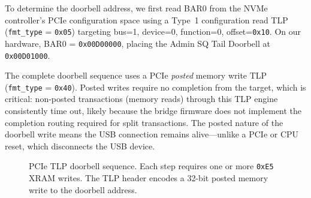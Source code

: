 \documentclass[conference]{IEEEtran}
\begin{document}
To determine the doorbell address, we first read BAR0 from the NVMe
controller's PCIe configuration space using a Type~1 configuration read
TLP (\texttt{fmt\_type} = \texttt{0x05}) targeting bus=1, device=0,
function=0, offset=\texttt{0x10}. On our hardware, BAR0 =
\texttt{0x00D00000}, placing the Admin SQ Tail Doorbell at
\texttt{0x00D01000}.

The complete doorbell sequence uses a PCIe \emph{posted} memory write
TLP (\texttt{fmt\_type} = \texttt{0x40}). Posted writes require no
completion from the target, which is critical: non-posted transactions
(memory reads) through this TLP engine consistently time out, likely
because the bridge firmware does not implement the completion routing
required for split transactions. The posted nature of the doorbell write
means the USB connection remains alive---unlike a PCIe or CPU reset,
which disconnects the USB device.

\begin{figure}[ht]
\centering
{}
\caption{PCIe TLP doorbell sequence. Each step requires one or more
\texttt{0xE5} XRAM writes. The TLP header encodes a 32-bit posted
memory write to the doorbell address.}
\label{fig:tlp-sequence}
\end{figure}
\end{document}
